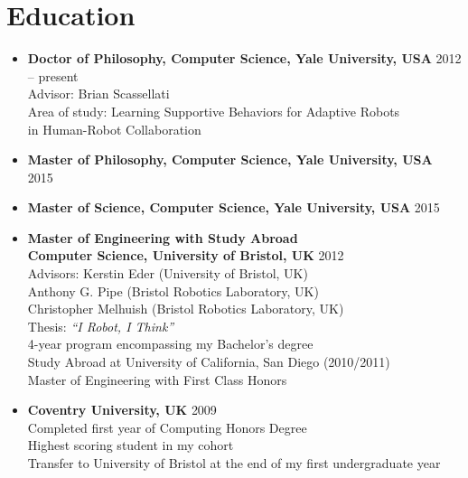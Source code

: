 \documentclass[10pt,letterpaper]{article}
\newcommand{\thing}[2]{{#1} \hfill {#2}}
\begin{document}
\section{Education}
\vspace{-0.5em}
\begin{itemize}%
\item \thing{\bf Doctor of Philosophy, Computer Science, Yale University, USA}{2012 -- present}\\
	Advisor: Brian Scassellati\\
	Area of study: Learning Supportive Behaviors for Adaptive Robots \\
	\hphantom{Area of study:} in Human-Robot Collaboration
\item \thing{\bf Master of Philosophy, Computer Science, Yale University, USA}{2015}
\item \thing{\bf Master of Science, Computer Science, Yale University, USA}{2015}
\item \thing{\bf Master of Engineering with Study Abroad\\Computer Science, University of Bristol, UK}{2012}\\
	Advisors: Kerstin Eder (University of Bristol, UK)\\
	\hphantom{Advisors:} Anthony G. Pipe (Bristol Robotics Laboratory, UK)\\
	\hphantom{Advisors:} Christopher Melhuish (Bristol Robotics Laboratory, UK)\\
	Thesis: {\it ``I Robot, I Think''}\\
	4-year program encompassing my Bachelor's degree\\
	Study Abroad at University of California, San Diego (2010/2011)\\
	Master of Engineering with First Class Honors
\item \thing{\bf Coventry University, UK}{2009}\\
	Completed first year of Computing Honors Degree\\
	Highest scoring student in my cohort\\
	Transfer to University of Bristol at the end of my first undergraduate year
\end{itemize}

\vspace{-1.8em}
\end{document}
